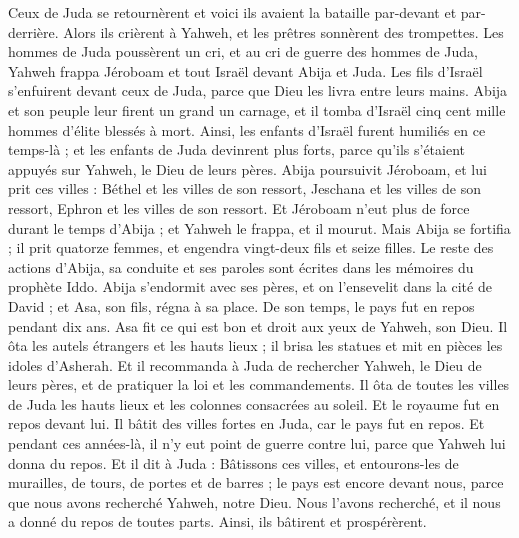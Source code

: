 \begin{multicols}{2}
Ceux de Juda se retournèrent et voici ils avaient la bataille par-devant et par-derrière. Alors ils crièrent à Yahweh, et les prêtres sonnèrent des trompettes.
Les hommes de Juda poussèrent un cri, et au cri de guerre des hommes de Juda, Yahweh frappa Jéroboam et tout Israël devant Abija et Juda.
Les fils d'Israël s'enfuirent devant ceux de Juda, parce que Dieu les livra entre leurs mains.
Abija et son peuple leur firent un grand un carnage, et il tomba d'Israël cinq cent mille hommes d'élite blessés à mort.
Ainsi, les enfants d'Israël furent humiliés en ce temps-là ; et les enfants de Juda devinrent plus forts, parce qu'ils s'étaient appuyés sur Yahweh, le Dieu de leurs pères.
 Abija poursuivit Jéroboam, et lui prit ces villes : Béthel et les villes de son ressort, Jeschana et les villes de son ressort, Ephron et les villes de son ressort.
Et Jéroboam n'eut plus de force durant le temps d'Abija ; et Yahweh le frappa, et il mourut.
Mais Abija se fortifia ; il prit quatorze femmes, et engendra vingt-deux fils et seize filles.
Le reste des actions d'Abija, sa conduite et ses paroles sont écrites dans les mémoires du prophète Iddo.
Abija s'endormit avec ses pères, et on l'ensevelit dans la cité de David ; et Asa, son fils, régna à sa place. De son temps, le pays fut en repos pendant dix ans.
\VerseOne{}Asa fit ce qui est bon et droit aux yeux de Yahweh, son Dieu.
Il ôta les autels étrangers et les hauts lieux ; il brisa les statues et mit en pièces les idoles d'Asherah.
Et il recommanda à Juda de rechercher Yahweh, le Dieu de leurs pères, et de pratiquer la loi et les commandements.
Il ôta de toutes les villes de Juda les hauts lieux et les colonnes consacrées au soleil. Et le royaume fut en repos devant lui.
Il bâtit des villes fortes en Juda, car le pays fut en repos. Et pendant ces années-là, il n'y eut point de guerre contre lui, parce que Yahweh lui donna du repos.
Et il dit à Juda : Bâtissons ces villes, et entourons-les de murailles, de tours, de portes et de barres ; le pays est encore devant nous, parce que nous avons recherché Yahweh, notre Dieu. Nous l'avons recherché, et il nous a donné du repos de toutes parts. Ainsi, ils bâtirent et prospérèrent.

\end{multicols}
